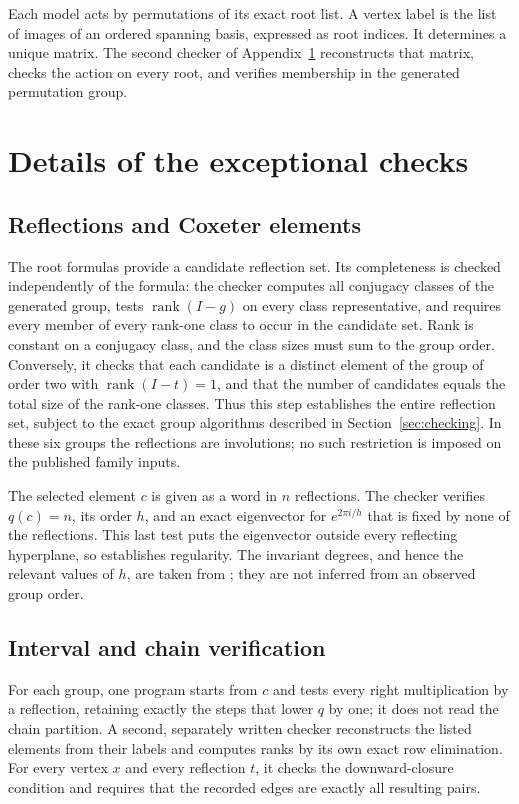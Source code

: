\documentclass[11pt]{article}
\theoremstyle{definition}
\newcommand{\rank}{\operatorname{rank}}
\begin{document}
\begin{appendices}
Each model acts by permutations of its exact root list. A vertex label
is the list of images of an ordered spanning basis, expressed as root
indices. It determines a unique matrix. The second checker of Appendix~\ref{app:checks} reconstructs
that matrix, checks the action on every root, and verifies membership in
the generated permutation group.

\section{Details of the exceptional checks}\label{app:checks}
\subsection*{Reflections and Coxeter elements}
The root formulas provide a candidate reflection set. Its completeness
is checked independently of the formula: the checker computes all
conjugacy classes of the generated group, tests $\rank(I-g)$ on every
class representative, and requires every member of every rank-one class
to occur in the candidate set. Rank is constant on a conjugacy class,
and the class sizes must sum to the group order. Conversely, it checks
that each candidate is a distinct element of the group of order two
with $\rank(I-t)=1$, and that the number of candidates equals the total
size of the rank-one classes. Thus this step establishes
the entire reflection set, subject to the exact group algorithms
described in Section~\ref{sec:checking}. In these six groups the
reflections are involutions; no such restriction is imposed on the
published family inputs.

The selected element $c$ is given as a word in $n$ reflections.
The checker verifies $q(c)=n$, its order $h$, and an exact eigenvector
for $e^{2\pi i/h}$ that is fixed by none of the reflections. This last
test puts the eigenvector outside every reflecting hyperplane, so
establishes regularity. The invariant degrees, and hence the relevant
values of $h$, are taken from \cite[Table~2]{Bessis}; they are not
inferred from an observed group order.

\subsection*{Interval and chain verification}
For each group, one program starts from $c$ and tests every right
multiplication by a reflection, retaining exactly the steps that lower
$q$ by one; it does not read the chain partition. A second, separately
written checker reconstructs the listed elements from their labels and
computes ranks by its own exact row elimination. For every vertex $x$ and every
reflection $t$, it checks the downward-closure condition and requires
that the recorded edges are exactly all resulting pairs.


\end{appendices}
\end{document}
